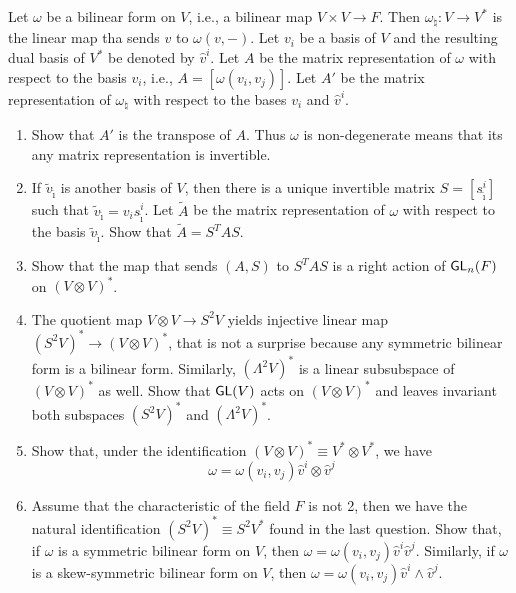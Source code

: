 \begin{problem}
  Let $\omega$ be a bilinear form on $V$, i.e., a bilinear map $V \times V \to F$. Then $\omega_{\natural}: V \to V^*$ is the linear map tha sends $v$ to $\omega(v, -)$. Let $v_i$ be a basis of $V$ and the resulting dual basis of $V^*$ be denoted by $\hat{v}^i$. Let $A$ be the matrix representation of $\omega$ with respect to the basis $v_i$, i.e., $A = [\omega(v_i, v_j)]$. Let $A'$ be the matrix representation of $\omega_{\natural}$ with respect to the bases $v_i$ and $\hat{v}^i$. 
  \begin{enumerate}
    \item Show that $A'$ is the transpose of $A$. Thus $\omega$ is non-degenerate means that its any matrix representation is invertible.
    \item If $\tilde{v}_{\tilde{\imath}}$ is another basis of $V$, then there is a unique invertible matrix $S = [s^i_{\tilde{\imath}}]$ such that $\tilde{v}_{\tilde{\imath}} = v_i s^i_{\tilde{\imath}}$. Let $\tilde{A}$ be the matrix representation of $\omega$ with respect to the basis $\tilde{v}_{\tilde{\imath}}$. Show that $\tilde{A} = S^T A S$.
    \item Show that the map that sends $(A, S)$ to $S^T A S$ is a right action of $\operatorname{\text{\normalfont\sffamily GL}}_n(F)$ on ${(V \otimes V)}^*$.
    \item The quotient map $V \otimes V \to S^2 V$ yields injective linear map ${(S^2 V)}^* \to {(V \otimes V)}^*$, that is not a surprise because any symmetric bilinear form is a bilinear form. Similarly, ${(\Lambda^2 V)}^*$ is a linear subsubspace of ${(V \otimes V)}^*$ as well. Show that $\operatorname{\text{\normalfont\sffamily GL}}(V)$ acts on ${(V \otimes V)}^*$ and leaves invariant both subspaces ${(S^2 V)}^*$ and ${(\Lambda^2 V)}^*$.
    \item Show that, under the identification ${(V \otimes V)}^* \equiv V^* \otimes V^*$, we have 
    \[
        \omega = \omega(v_i, v_j) \hat{v}^i \otimes \hat{v}^j
    \]
    \item Assume that the characteristic of the field $F$ is not 2, then we have the natural identification ${(S^2 V)}^* \equiv S^2 V^*$ found in the last question. Show that, if $\omega$ is a symmetric bilinear form on $V$, then $\omega = \omega(v_i, v_j) \hat{v}^i \hat{v}^j$. Similarly, if $\omega$ is a skew-symmetric bilinear form on $V$, then $\omega = \omega(v_i, v_j) \hat{v}^i \wedge \hat{v}^j$.
  \end{enumerate}
\end{problem}